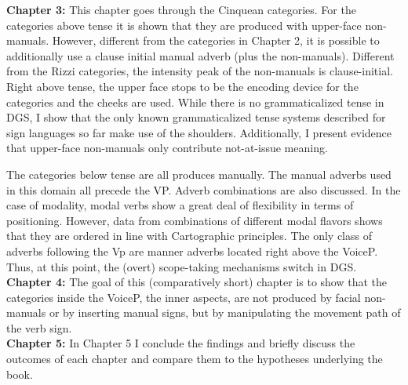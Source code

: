 \documentclass[a4paper,DIV=calc,11pt]{scrartcl}
\begin{document}
\noindent \textbf{Chapter 3:} This chapter goes through the Cinquean categories. For the categories above tense it is shown that they are produced with upper-face non-manuals. However, different from the categories in Chapter 2, it is possible to additionally use a clause initial manual adverb (plus the non-manuals). Different from the Rizzi categories, the intensity peak of the non-manuals is clause-initial. Right above tense, the upper face stops to be the encoding device for the categories and the cheeks are used. While there is no grammaticalized tense in DGS, I show that the only known grammaticalized tense systems described for sign languages so far make use of the shoulders. Additionally, I present evidence that upper-face non-manuals only contribute not-at-issue meaning.

The categories below tense are all produces manually. The manual adverbs used in this domain all precede the VP. Adverb combinations are also discussed. In the case of modality, modal verbs show a great deal of flexibility in terms of positioning. However, data from combinations of different modal flavors shows that they are ordered in line with Cartographic principles. The only class of adverbs following the Vp are manner adverbs located right above the VoiceP. Thus, at this point, the (overt) scope-taking mechanisms switch in DGS. \\

\noindent \textbf{Chapter 4:} The goal of this (comparatively short) chapter is to show that the categories inside the VoiceP, the inner aspects, are not produced by facial non-manuals or by inserting manual signs, but by manipulating the movement path of the verb sign.\\

\noindent \textbf{Chapter 5:} In Chapter 5 I conclude the findings and briefly discuss the outcomes of each chapter and compare them to the hypotheses underlying the book.
\end{document}
